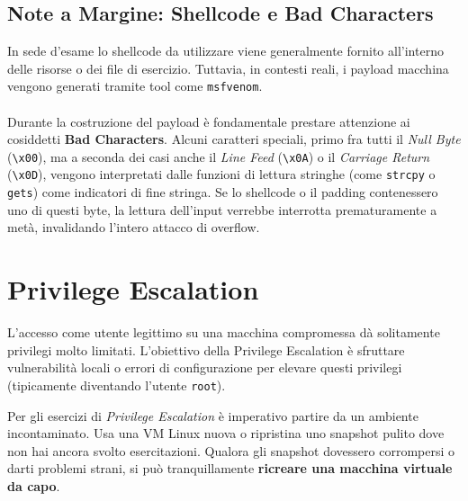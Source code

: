 \documentclass[12pt,a4paper]{report}
\begin{document}
	\section{Note a Margine: Shellcode e Bad Characters}
	In sede d'esame lo shellcode da utilizzare viene generalmente fornito all'interno delle risorse o dei file di esercizio. Tuttavia, in contesti reali, i payload macchina vengono generati tramite tool come \texttt{msfvenom}.\\\\
	Durante la costruzione del payload è fondamentale prestare attenzione ai cosiddetti \textbf{Bad Characters}. Alcuni caratteri speciali, primo fra tutti il \textit{Null Byte} (\texttt{\textbackslash x00}), ma a seconda dei casi anche il \textit{Line Feed} (\texttt{\textbackslash x0A}) o il \textit{Carriage Return} (\texttt{\textbackslash x0D}), vengono interpretati dalle funzioni di lettura stringhe (come \texttt{strcpy} o \texttt{gets}) come indicatori di fine stringa. Se lo shellcode o il padding contenessero uno di questi byte, la lettura dell'input verrebbe interrotta prematuramente a metà, invalidando l'intero attacco di overflow.
	
	\chapter{Privilege Escalation}
	
	L'accesso come utente legittimo su una macchina compromessa dà solitamente privilegi molto limitati. L'obiettivo della Privilege Escalation è sfruttare vulnerabilità locali o errori di configurazione per elevare questi privilegi (tipicamente diventando l'utente \texttt{root}).
	
	\begin{nota}
	 Per gli esercizi di \textit{Privilege Escalation} è imperativo partire da un ambiente incontaminato. Usa una VM Linux nuova o ripristina uno snapshot pulito dove non hai ancora svolto esercitazioni. Qualora gli snapshot dovessero corrompersi o darti problemi strani, si può tranquillamente \textbf{ricreare una macchina virtuale da capo}.
	\end{nota}
	
\end{document}
